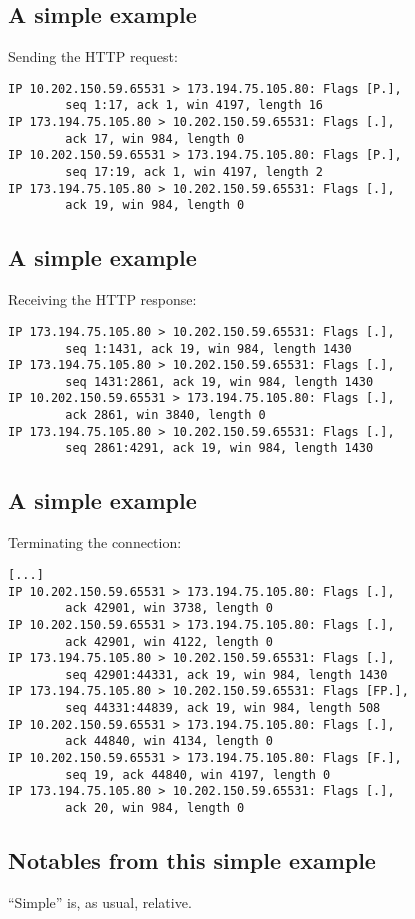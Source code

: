 \documentclass[xga]{xdvislides}
\begin{document}
\subsection{A simple example}
Sending the HTTP request:
\begin{verbatim}
IP 10.202.150.59.65531 > 173.194.75.105.80: Flags [P.],
        seq 1:17, ack 1, win 4197, length 16
IP 173.194.75.105.80 > 10.202.150.59.65531: Flags [.],
        ack 17, win 984, length 0
IP 10.202.150.59.65531 > 173.194.75.105.80: Flags [P.],
        seq 17:19, ack 1, win 4197, length 2
IP 173.194.75.105.80 > 10.202.150.59.65531: Flags [.],
        ack 19, win 984, length 0
\end{verbatim}

\subsection{A simple example}
Receiving the HTTP response:
\begin{verbatim}
IP 173.194.75.105.80 > 10.202.150.59.65531: Flags [.],
        seq 1:1431, ack 19, win 984, length 1430
IP 173.194.75.105.80 > 10.202.150.59.65531: Flags [.],
        seq 1431:2861, ack 19, win 984, length 1430
IP 10.202.150.59.65531 > 173.194.75.105.80: Flags [.],
        ack 2861, win 3840, length 0
IP 173.194.75.105.80 > 10.202.150.59.65531: Flags [.],
        seq 2861:4291, ack 19, win 984, length 1430
\end{verbatim}

\subsection{A simple example}
Terminating the connection:
\begin{verbatim}
[...]
IP 10.202.150.59.65531 > 173.194.75.105.80: Flags [.],
        ack 42901, win 3738, length 0
IP 10.202.150.59.65531 > 173.194.75.105.80: Flags [.],
        ack 42901, win 4122, length 0
IP 173.194.75.105.80 > 10.202.150.59.65531: Flags [.],
        seq 42901:44331, ack 19, win 984, length 1430
IP 173.194.75.105.80 > 10.202.150.59.65531: Flags [FP.],
        seq 44331:44839, ack 19, win 984, length 508
IP 10.202.150.59.65531 > 173.194.75.105.80: Flags [.],
        ack 44840, win 4134, length 0
IP 10.202.150.59.65531 > 173.194.75.105.80: Flags [F.],
        seq 19, ack 44840, win 4197, length 0
IP 173.194.75.105.80 > 10.202.150.59.65531: Flags [.],
        ack 20, win 984, length 0
\end{verbatim}

\subsection{Notables from this simple example}
``Simple'' is, as usual, relative.
\\
\end{document}
